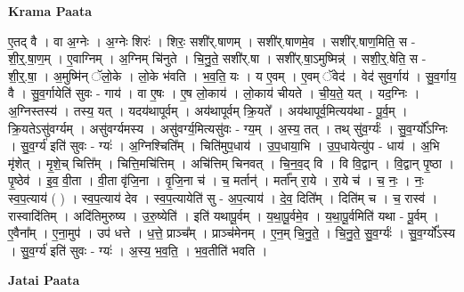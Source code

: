 \documentclass[17pt]{extarticle}
\begin{document}
\textbf{Krama Paata} \newline

ए॒तद् वै । वा अ॒ग्नेः । अ॒ग्नेः शिरः॑ । शिरः॒ सशी॑र्.षाणम् । सशी॑र्.षाणमे॒व । सशी॑र्.षाण॒मिति॒ स - शी॒र्॒.षा॒ण॒म् । ए॒वाग्निम् । अ॒ग्निम् चि॑नुते । चि॒नु॒ते॒ सशी॑र्.षा । सशी॑र्.षा॒ऽमुष्मिन्न्॑ । सशी॒र्॒.षेति॒ स - शी॒र्॒.षा॒ । अ॒मुष्मि॑न् ॅलो॒के । लो॒के भ॑वति । भ॒व॒ति॒ यः । य ए॒वम् । ए॒वम् ॅवेद॑ । वेद॑ सुव॒र्गाय॑ । सु॒व॒र्गाय॒ वै । सु॒व॒र्गायेति॑ सुवः - गाय॑ । वा ए॒षः । ए॒ष लो॒काय॑ । लो॒काय॑ चीयते । ची॒य॒ते॒ यत् । यद॒ग्निः । अ॒ग्निस्तस्य॑ । तस्य॒ यत् । यदय॑थापूर्वम् । अय॑थापूर्वम् क्रि॒यते᳚ । अय॑थापूर्व॒मित्यय॑था - पू॒र्व॒म् । क्रि॒यतेऽसु॑वर्ग्यम् । असु॑वर्ग्यमस्य । असु॑वर्ग्य॒मित्यसु॑वः - ग्य॒म् । अ॒स्य॒ तत् । तथ् सु॑व॒र्ग्यः॑ । सु॒व॒र्ग्यो᳚ऽग्निः । सु॒व॒र्ग्य॑ इति॑ सुवः - ग्यः॑ । अ॒ग्निश्चिति᳚म् । चिति॑मुप॒धाय॑ । उ॒प॒धाया॒भि । उ॒प॒धायेत्यु॑प - धाय॑ । अ॒भि मृ॑शेत् । मृ॒शे॒च् चित्ति᳚म् । चित्ति॒मचि॑त्तिम् । अचि॑त्तिम् चिनवत् । चि॒न॒व॒द् वि । वि वि॒द्वान् । वि॒द्वान् पृ॒ष्ठा । पृ॒ष्ठेव॑ । इ॒व॒ वी॒ता । वी॒ता वृ॑जि॒ना । वृ॒जि॒ना च॑ । च॒ मर्तान्॑ । मर्ता᳚न् रा॒ये । रा॒ये च॑ । च॒ नः॒ । नः॒ स्व॒प॒त्याय॑ ( ) । स्व॒प॒त्याय॑ देव । स्व॒प॒त्यायेति॑ सु - अ॒प॒त्याय॑ । दे॒व॒ दिति᳚म् । दिति॑म् च । च॒ रास्व॑ । रास्वादि॑तिम् । अदि॑तिमुरुष्य । उ॒रु॒ष्येति॑ । इति॑ यथापू॒र्वम् । य॒था॒पू॒र्वमे॒व । य॒था॒पू॒र्वमिति॑ यथा - पू॒र्वम् । ए॒वैना᳚म् । ए॒ना॒मुप॑ । उप॑ धत्ते । ध॒त्ते॒ प्राञ्च᳚म् । प्राञ्च॑मेनम् । ए॒न॒म् चि॒नु॒ते॒ । चि॒नु॒ते॒ सु॒व॒र्ग्यः॑ । सु॒व॒र्ग्यो᳚ऽस्य । सु॒व॒र्ग्य॑ इति॑ सुवः - ग्यः॑ । अ॒स्य॒ भ॒व॒ति॒ । भ॒व॒तीति॑ भवति । \newline

\textbf{Jatai Paata} \newline
\end{document}
